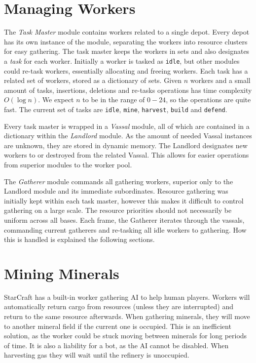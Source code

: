 \section{Managing Workers}
\label{sec:manageWorkers}
The \emph{Task Master} module contains workers related to a single depot. Every depot has its own instance of the module, separating the workers into resource clusters for easy gathering. The task master keeps the workers in sets and also designates a \emph{task} for each worker. Initially a worker is tasked as \texttt{idle}, but other modules could re-task workers, essentially allocating and freeing workers. Each task has a related set of workers, stored as a dictionary of sets. Given $n$ workers and a small amount of tasks, insertions, deletions and re-tasks operations has time complexity $O(\log n)$. We expect $n$ to be in the range of $0-24$, so the operations are quite fast. The current set of tasks are \texttt{idle}, \texttt{mine}, \texttt{harvest}, \texttt{build} and \texttt{defend}.

Every task master is wrapped in a \emph{Vassal} module, all of which are contained in a dictionary within the \emph{Landlord} module. As the amount of needed Vassal instances are unknown, they are stored in dynamic memory. The Landlord designates new workers to or destroyed from the related Vassal. This allows for easier operations from superior modules to the worker pool.

The \emph{Gatherer} module commands all gathering workers, superior only to the Landlord module and its immediate subordinates. Resource gathering was initially kept within each task master, however this makes it difficult to control gathering on a large scale. The resource priorities should not necessarily be uniform across all bases. Each frame, the Gatherer iterates through the vassals, commanding current gatherers and re-tasking all idle workers to gathering. How this is handled is explained the following sections.

\section{Mining Minerals}
StarCraft has a built-in worker gathering AI to help human players. Workers will automatically return cargo from resources (unless they are interrupted) and return to the same resource afterwards. When gathering minerals, they will move to another mineral field if the current one is occupied. This is an inefficient solution, as the worker could be stuck moving between minerals for long periods of time. It is also a liability for a bot, as the AI cannot be disabled. When harvesting gas they will wait until the refinery is unoccupied.

